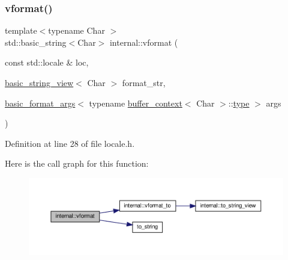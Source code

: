 \subsubsection{\texorpdfstring{vformat()}{vformat()}\hspace{0.1cm}{\footnotesize\ttfamily [1/2]}}
{\footnotesize\ttfamily template$<$typename Char $>$ \\
std\+::basic\+\_\+string$<$Char$>$ internal\+::vformat (\begin{DoxyParamCaption}\item[{const std\+::locale \&}]{loc,  }\item[{\hyperlink{classbasic__string__view}{basic\+\_\+string\+\_\+view}$<$ Char $>$}]{format\+\_\+str,  }\item[{\hyperlink{classbasic__format__args}{basic\+\_\+format\+\_\+args}$<$ typename \hyperlink{structbuffer__context}{buffer\+\_\+context}$<$ Char $>$\+::\hyperlink{namespaceinternal_a8661864098ac0acff9a6dd7e66f59038}{type} $>$}]{args }\end{DoxyParamCaption})}



Definition at line 28 of file locale.\+h.

Here is the call graph for this function\+:
\nopagebreak
\begin{figure}[H]
\begin{center}
\leavevmode
\includegraphics[width=350pt]{namespaceinternal_a1904f9fcad1333e8658da7816f8df368_cgraph}
\end{center}
\end{figure}
\mbox{\label{namespaceinternal_a581988072e193a0fb0f54827f1b42cfd}} 
